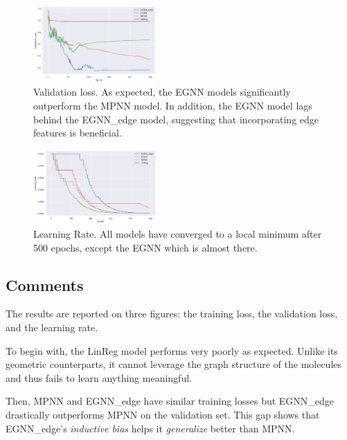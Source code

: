\documentclass[sigconf]{acmart}
\begin{document}
\begin{figure}
    \centering
    \includegraphics[width=0.42\textwidth]{figures/validation_loss.png}
    \caption{Validation loss. As expected, the EGNN models significantly outperform the MPNN model. In addition, the EGNN model lags behind the EGNN\_edge model, suggesting that incorporating edge features is beneficial.}
    \label{fig:validation-loss}
\end{figure}

\begin{figure}
    \centering
    \includegraphics[width=0.42\textwidth]{figures/learning_rate.png}
    \caption{Learning Rate. All models have converged to a local minimum after 500 epochs, except the EGNN which is almost there.}
    \label{fig:learning-rate}
\end{figure}

\subsection{Comments}
The results are reported on three figures: the training loss, the validation loss, and the learning rate.

To begin with, the LinReg model performs very poorly as expected. Unlike its geometric counterparts, it cannot leverage the graph structure of the molecules and thus fails to learn anything meaningful.

Then, MPNN and EGNN\_edge have similar training losses but EGNN\_edge drastically outperforms MPNN on the validation set. This gap shows that EGNN\_edge's \textit{inductive bias} helps it \textit{generalize} better than MPNN.
\end{document}
